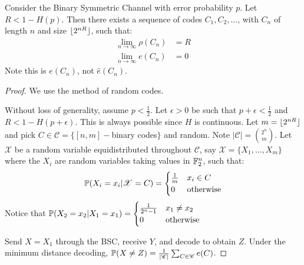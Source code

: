 \documentclass[10pt,a4paper]{article}
\begin{document}
\begin{proposition}
Consider the Binary Symmetric Channel with error probability $p$. Let $R < 1- H(p)$. Then there exists a sequence of codes $C_1, C_2, \ldots$, with $C_n$ of length $n$ and size $\floor{2^{nR}}$, such that:
\begin{align*}
\lim_{n \to \infty} \rho(C_n) &= R\\
\lim_{n \to \infty} e(C_n) &= 0
\end{align*}
Note this is $e(C_n)$, not $\hat{e}(C_n)$.
\end{proposition}
\begin{proof}
We use the method of random codes.

Without loss of generality, assume $p <\frac12$. Let $\epsilon > 0$ be such that $p + \epsilon < \frac12$ and $R < 1 - H(p + \epsilon)$. This is always possible since $H$ is continuous. Let $m = \floor{2^{nR}}$ and pick $C \in \mathscr{C} = \{[n,m]-$binary codes$\}$ and random. Note $|\mathscr{C}| = \binom{2^n}{m}$. Let $\mathscr{X}$ be a random variable equidistributed throughout $\mathscr{C}$, say $\mathscr{X} = \{X_1, \ldots, X_m\}$ where the $X_i$ are random variables taking values in $\F_2^n$, such that:
\begin{align*}
\P(X_i = x_i | \mathscr{X} = C) = \begin{cases} \frac1m & x_i \in C \\ 0 & \ow \end{cases}
\end{align*}
Notice that $\P(X_2 = x_2| X_1 = x_1) = \begin{cases} \frac{1}{2^n-1} & x_1\neq x_2\\ 0 & \ow \end{cases}$

Send $X = X_1$ through the BSC, receive $Y$, and decode to obtain $Z$. Under the minimum distance decoding, $\P(X \neq Z) = \frac{1}{|\mathscr{C}|}\sum_{C \in \mathscr{C}} e(C)$.


\end{proof}
\end{document}
